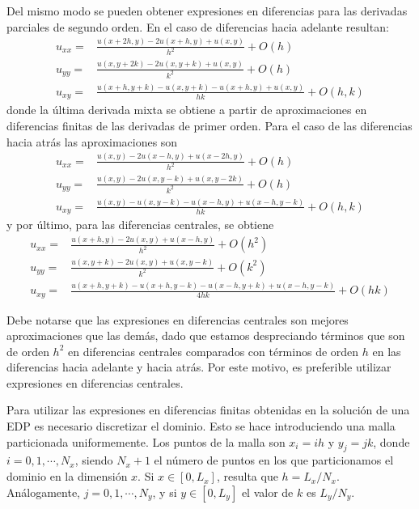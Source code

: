 Del mismo modo se pueden obtener expresiones en diferencias para las derivadas parciales de segundo orden. En el caso de diferencias hacia adelante resultan:
\begin{align*}
 u_{xx} =& \frac{u(x+2h, y) -2u(x+h, y) + u(x,y)}{h^2} + O(h) \\
 u_{yy} =& \frac{u(x, y+2k) -2u(x, y+k) + u(x,y)}{k^2} + O(h) \\
 u_{xy} =& \frac{u(x+h, y+k) - u(x, y+k) -u(x+h, y) + u(x, y)}{hk} + O(h, k)
\end{align*}
donde la última derivada mixta se obtiene a partir de aproximaciones en diferencias finitas de las derivadas de primer orden. Para el caso de las diferencias hacia atrás las aproximaciones son
\begin{align*}
 u_{xx} =& \frac{u(x, y) - 2u(x - h, y) + u(x -2h,y)}{h^2} + O(h) \\
 u_{yy} =& \frac{u(x, y) - 2u(x, y - k) + u(x,y -2k)}{k^2} + O(h) \\
 u_{xy} =& \frac{u(x, y) - u(x, y - k) - u(x - h, y) + u(x - h, y - k)}{hk} + O(h, k)
\end{align*}
y por último, para las diferencias centrales, se obtiene
\begin{align*}
 u_{xx} =& \frac{u(x + h, y) - 2 u(x, y) + u(x-h, y)}{h^2} + O(h^2) \\
 u_{yy} =& \frac{u(x, y + k) - 2 u(x, y) + u(x, y - k)}{k^2} + O(k^2) \\
 u_{xy} =& \frac{u(x+h, y+k) - u(x+h, y-k) -u(x-h, y+k) + u(x-h, y-k)}{4 h k} + O(hk)
\end{align*}

Debe notarse que las expresiones en diferencias centrales son mejores aproximaciones que las demás, dado que estamos despreciando términos que son de orden $h^2$ en diferencias centrales comparados con términos de orden $h$ en las diferencias hacia adelante y hacia atrás. Por este motivo, es preferible utilizar expresiones en diferencias centrales.

Para utilizar las expresiones en diferencias finitas obtenidas en la solución de una EDP es necesario discretizar el dominio. Esto se hace introduciendo una malla particionada uniformemente. Los puntos de la malla son $x_i = i h$ y $y_j = j k$, donde $i = 0, 1, \cdots, N_x$, siendo $N_x + 1$ el número de puntos en los que particionamos el dominio en la dimensión $x$. Si $x \in [0, L_x]$, resulta que $h = L_x / N_x$. Análogamente, $j = 0, 1, \cdots, N_y$, y si $y \in [0, L_y]$ el valor de $k$ es $L_y/N_y$.

